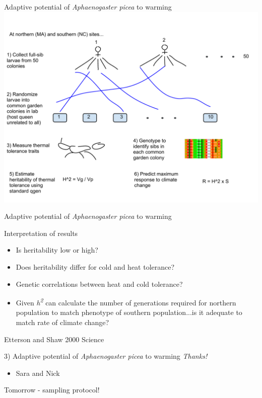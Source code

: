 \documentclass{beamer}
\begin{document}
\begin{frame}{Adaptive potential of \textit{Aphaenogaster picea} to warming}
	\includegraphics[width=\textwidth, height=\textheight, keepaspectratio]{adaptive_potential_diagram.pdf}
\end{frame}{}


\begin{frame}{ Adaptive potential of \textit{Aphaenogaster picea} to warming}
	\begin{block}{Interpretation of results}
		\begin{itemize}
			\item Is heritability low or high? 
			\item Does heritability differ for cold and heat tolerance?
			\item Genetic correlations between heat and cold tolerance?
			\item Given \textit{h\textsuperscript{2}} can calculate the number of generations required for northern population to match phenotype of southern population...is it adequate to match rate of climate change?
		\end{itemize}

		\tiny{Etterson and Shaw 2000 Science}
	\end{block}
\end{frame}


\begin{frame}{3) Adaptive potential of \textit{Aphaenogaster picea} to warming}
	\textit{Thanks!}
	\begin{itemize}
		\item Sara and Nick
	\end{itemize}

	Tomorrow - sampling protocol!

\end{frame}
\end{document}
